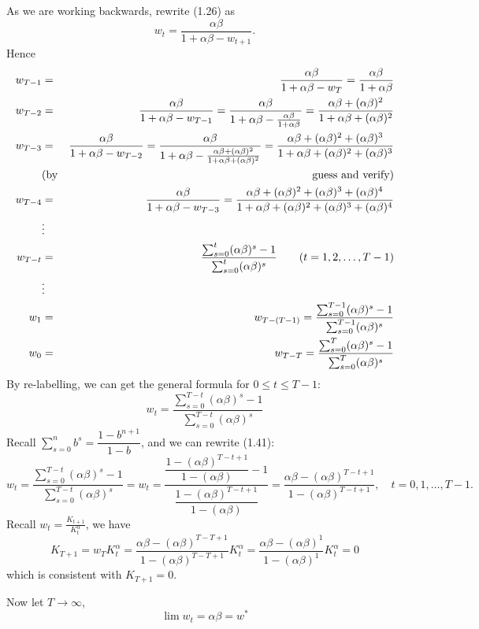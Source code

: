 \documentclass[twoside]{article}
\begin{document}
\begin{example}
As we are working backwards, rewrite (1.26) as 
\begin{equation}
  w_{t} = \frac{\alpha\beta}{1+\alpha\beta-{w_{t+1}}}.
\end{equation}
Hence
\begin{eqnarray}
  w_{T-1} &=& \frac{\alpha\beta}{1+\alpha\beta- w_{T}} =  \frac{\alpha\beta}{1+\alpha\beta}\\
  w_{T-2} &=& \frac{\alpha\beta}{1+\alpha\beta- w_{T-1}} = \frac{\alpha\beta}{1+\alpha\beta- \frac{\alpha\beta}{1+\alpha\beta}} = \frac{\alpha\beta + (\alpha\beta)^2}{1+\alpha\beta + (\alpha\beta)^2}\\
  w_{T-3} &=& \frac{\alpha\beta}{1+\alpha\beta- w_{T-2}} 
  =  \frac{\alpha\beta}{1+\alpha\beta - \frac{\alpha\beta + (\alpha\beta)^2}{1+\alpha\beta + (\alpha\beta)^2}}  
  = \frac{\alpha\beta + (\alpha\beta)^2 + (\alpha\beta)^3 }{1+\alpha\beta + (\alpha\beta)^2 + (\alpha\beta)^3}\\
  &\text{(by}& \text{guess and verify)} \notag\\
  w_{T-4} &=& \frac{\alpha\beta}{1+\alpha\beta- w_{T-3}} 
  = \frac{\alpha\beta + (\alpha\beta)^2 + (\alpha\beta)^3 + (\alpha\beta)^4 }{1+\alpha\beta + (\alpha\beta)^2 + (\alpha\beta)^3 + (\alpha\beta)^4}\\
  &\vdots& \notag\\
  w_{T-t} &=& \frac{\sum_{s=0}^{t} (\alpha\beta)^s - 1}{\sum_{s=0}^{t} (\alpha\beta)^s} \qquad (t = 1,2,\dots, T-1)\\
  &\vdots& \notag\\
  w_1 &=& w_{T-(T-1)} = \frac{\sum_{s=0}^{T-1} (\alpha\beta)^s - 1}{\sum_{s=0}^{T-1} (\alpha\beta)^s}\\
  w_0 &=& w_{T-T} = \frac{\sum_{s=0}^{T} (\alpha\beta)^s - 1}{\sum_{s=0}^{T} (\alpha\beta)^s}
\end{eqnarray}
By re-labelling, we can get the general formula for $0 \leq t \leq T-1$:
\begin{equation}
  w_{t} = \frac{\sum_{s=0}^{T-t} (\alpha\beta)^s - 1}{\sum_{s=0}^{T-t} (\alpha\beta)^s}
\end{equation}
Recall $\sum\limits_{s=0}^{n} b^s = \dfrac{1-b^{n+1}}{1-b}$, and we can rewrite (1.41):
\begin{equation}
  w_{t} = \frac{\sum_{s=0}^{T-t} (\alpha\beta)^s - 1}{\sum_{s=0}^{T-t} (\alpha\beta)^s} = w_{t} = \frac{\dfrac{1-(\alpha\beta)^{T-t+1}}{1-(\alpha\beta)} - 1}{\dfrac{1-(\alpha\beta)^{T-t+1}}{1-(\alpha\beta)}} = \frac{\alpha \beta - (\alpha\beta)^{T-t+1}}{1- (\alpha\beta)^{T-t+1}}, \quad t = 0, 1, \dots, T-1.
\end{equation}
Recall $w_t = \frac{K_{t+1}}{K_t^\alpha}$, we have
\begin{equation}
  K_{T+1} = {w_T}{K_t^\alpha} =  \frac{\alpha \beta - (\alpha\beta)^{T-T+1}}{1- (\alpha\beta)^{T-T+1}} K_t^{\alpha} = \frac{\alpha \beta - (\alpha\beta)^{1}}{1- (\alpha\beta)^{1}} K_t^{\alpha} = 0
\end{equation}
which is consistent with $K_{T+1} = 0$.

Now let $T \longrightarrow \infty$, $$\lim w_t = \alpha \beta = w^*$$

\end{example}
\end{document}
